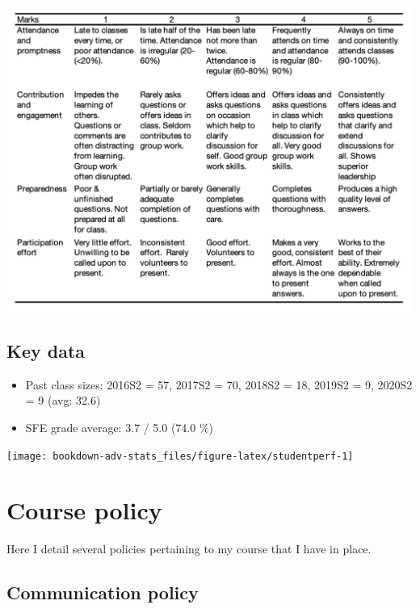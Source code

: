 \documentclass[
]{book}
\providecommand{\tightlist}{%
  \setlength{\itemsep}{0pt}\setlength{\parskip}{0pt}}
\theoremstyle{definition}
\theoremstyle{definition}
\theoremstyle{definition}
\theoremstyle{definition}
\theoremstyle{remark}
\begin{document}
\includegraphics{figure/participation.png}

\hypertarget{key-data}{%
\subsection*{Key data}\label{key-data}}

\begin{itemize}
\tightlist
\item
  Past class sizes: 2016S2 = 57, 2017S2 = 70, 2018S2 = 18, 2019S2 = 9, 2020S2 = 9 (avg: 32.6)
\item
  SFE grade average: 3.7 / 5.0 (74.0 \%)
\end{itemize}

\begin{center}\texttt{[image: bookdown-adv-stats\_files/figure-latex/studentperf-1]} \end{center}

\hypertarget{course-policy}{%
\section*{Course policy}\label{course-policy}}

Here I detail several policies pertaining to my course that I have in place.

\hypertarget{communication-policy}{%
\subsection*{Communication policy}\label{communication-policy}}
\end{document}
